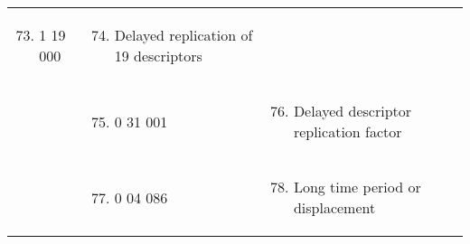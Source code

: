 \begin{longtable}[]{@{}llll@{}}
\begin{minipage}[t]{0.22\columnwidth}
\begin{enumerate}
\setcounter{enumi}{72}
\item
  1 19 000
\end{enumerate}\strut
\end{minipage} & \begin{minipage}[t]{0.22\columnwidth}\raggedright
\begin{enumerate}
\setcounter{enumi}{73}
\item
  Delayed replication of 19 descriptors
\end{enumerate}\strut
\end{minipage} & \begin{minipage}[t]{0.22\columnwidth}\raggedright
\strut
\end{minipage}\tabularnewline
\begin{minipage}[t]{0.22\columnwidth}\raggedright
\strut
\end{minipage} & \begin{minipage}[t]{0.22\columnwidth}\raggedright
\begin{enumerate}
\setcounter{enumi}{74}
\item
  0 31 001
\end{enumerate}\strut
\end{minipage} & \begin{minipage}[t]{0.22\columnwidth}\raggedright
\begin{enumerate}
\setcounter{enumi}{75}
\item
  Delayed descriptor replication factor
\end{enumerate}\strut
\end{minipage} & \begin{minipage}[t]{0.22\columnwidth}\raggedright
\strut
\end{minipage}\tabularnewline
\begin{minipage}[t]{0.22\columnwidth}\raggedright
\strut
\end{minipage} & \begin{minipage}[t]{0.22\columnwidth}\raggedright
\begin{enumerate}
\setcounter{enumi}{76}
\item
  0 04 086
\end{enumerate}\strut
\end{minipage} & \begin{minipage}[t]{0.22\columnwidth}\raggedright
\begin{enumerate}
\setcounter{enumi}{77}
\item
  Long time period or displacement
\end{enumerate}\strut

\end{minipage}
\end{longtable}
